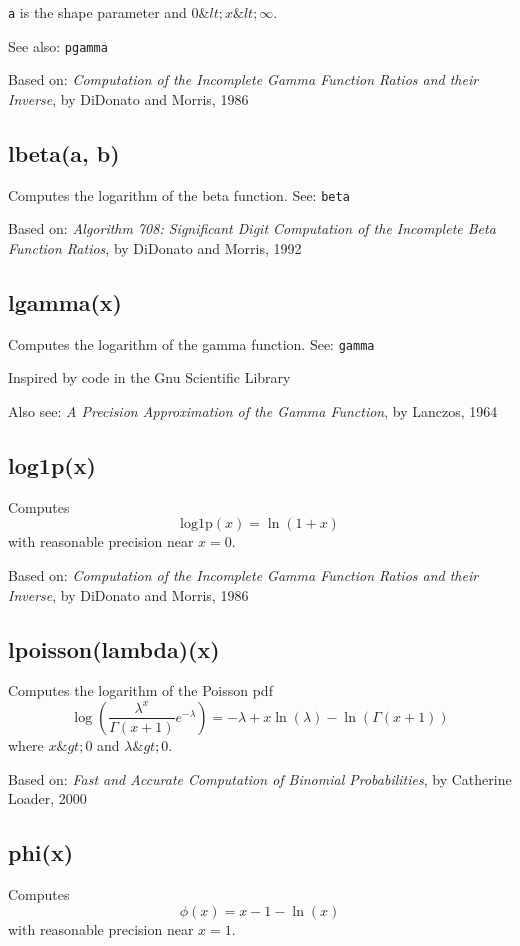 \documentclass{article}
\begin{document}
\texttt{a} is the shape parameter and $0 \&lt; x \&lt; \infty$.


See also: \texttt{pgamma}


Based on:  \emph{Computation of the Incomplete Gamma Function Ratios
and their Inverse}, by DiDonato and Morris, 1986


    \subsection*{lbeta(a, b)}
    Computes the logarithm of the beta function.
See: \texttt{beta}


Based on: \emph{Algorithm 708: Significant Digit Computation of the Incomplete Beta Function
Ratios}, by DiDonato and Morris, 1992


    \subsection*{lgamma(x)}
    Computes the logarithm of the gamma function.  See: \texttt{gamma}


Inspired by code in the Gnu Scientific Library


Also see: \emph{A Precision Approximation of the Gamma Function}, by
Lanczos, 1964


    \subsection*{log1p(x)}
    Computes $$\textrm{log1p}(x) = \ln(1+x)$$ with reasonable precision near $x = 0$.


Based on:  \emph{Computation of the Incomplete Gamma Function Ratios
and their Inverse}, by DiDonato and Morris, 1986


    \subsection*{lpoisson(lambda)(x)}
    Computes the logarithm of the Poisson pdf
$$\log\left(\frac{\lambda^x}{\Gamma(x+1)}e^{-\lambda}\right)
= -\lambda + x \ln(\lambda) - \ln(\Gamma(x+1))$$
where $x\&gt;0$ and $\lambda\&gt;0$.


Based on:  \emph{Fast and Accurate Computation of Binomial Probabilities},
by Catherine Loader, 2000


    \subsection*{phi(x)}
    Computes $$\phi(x) = x - 1 - \ln(x)$$ with reasonable precision
near $x = 1$.
\end{document}
